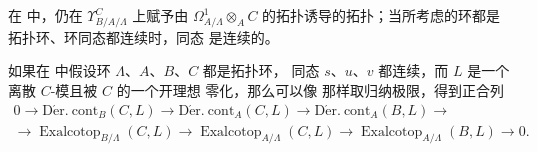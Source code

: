 \begin{env}[20.7.12]
\label{0.20.7.12-fr}
在  中，仍在 $\Upsilon^C_{B/A/\Lambda}$ 上赋予由
$\Omega^1_{A/\Lambda}\otimes_A C$ 的拓扑诱导的拓扑；当所考虑的环都是
拓扑环、环同态都连续时，同态  是连续的。
\end{env}

\begin{env}[20.7.13]
\label{0.20.7.13-fr}
如果在  中假设环 $\Lambda$、$A$、$B$、$C$ 都是拓扑环，
同态 $s$、$u$、$v$ 都连续，而 $L$ 是一个离散 $C$-模且被 $C$ 的一个开理想
零化，那么可以像  那样取归纳极限，得到正合列
\begin{equation}
\tag{20.7.13.1}
\label{0.20.7.13.1-fr}
\begin{split}
  0\to\operatorname{D\acute{e}r.\ cont}_B(C,L)\to
  \operatorname{D\acute{e}r.\ cont}_A(C,L)\to
  \operatorname{D\acute{e}r.\ cont}_A(B,L)\to \\
  \to\operatorname{Exalcotop}_{B/\Lambda}(C,L)\to
  \operatorname{Exalcotop}_{A/\Lambda}(C,L)\to
  \operatorname{Exalcotop}_{A/\Lambda}(B,L)\to0.
\end{split}
\end{equation}
\end{env}

